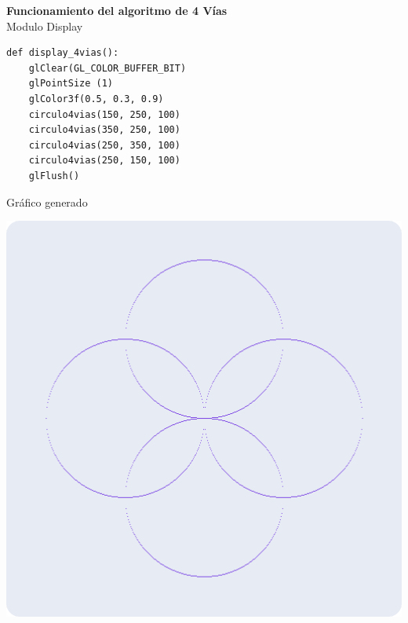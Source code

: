 \documentclass[a4paper]{article}
\begin{document}
\Large{\textbf{Funcionamiento del algoritmo de 4 Vías}}\\[0.5cm]
Modulo Display 
\begin{center}
\begin{mycodebox}
\begin{lstlisting}
def display_4vias():
    glClear(GL_COLOR_BUFFER_BIT)
    glPointSize (1)
    glColor3f(0.5, 0.3, 0.9) 
    circulo4vias(150, 250, 100)
    circulo4vias(350, 250, 100)
    circulo4vias(250, 350, 100)
    circulo4vias(250, 150, 100)
    glFlush()
\end{lstlisting}
\end{mycodebox}
\end{center}
Gráfico generado
\begin{center}
\includegraphics[width=15cm]{src/4vias.png}
\end{center}
\newpage
\end{document}
